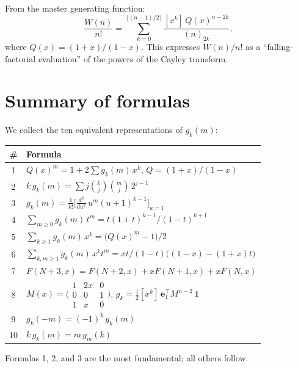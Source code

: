 \documentclass[11pt]{amsart}
\theoremstyle{definition}
\begin{document}
From the master generating function:
\[
\frac{W(n)}{n!} = \sum_{k=0}^{\lfloor(n-1)/2\rfloor} \frac{[x^k]\, Q(x)^{n-2k}}{(n)_{2k}},
\]
where $Q(x) = (1+x)/(1-x)$. This expresses $W(n)/n!$ as a ``falling-factorial evaluation'' of the powers of the Cayley transform.

\section{Summary of formulas}

We collect the ten equivalent representations of $g_k(m)$:

\begin{center}
\renewcommand{\arraystretch}{1.4}
\begin{tabular}{@{}cl@{}}
\toprule
\# & Formula \\
\midrule
1 & $Q(x)^m = 1 + 2\sum g_k(m)\, x^k$, \quad $Q = (1+x)/(1-x)$ \\
2 & $k\, g_k(m) = \sum j\binom{k}{j}\binom{m}{j}\, 2^{j-1}$ \\
3 & $g_k(m) = \frac{1}{k!}\bigl[\frac{d^k}{du^k}\, u^m(u+1)^{k-1}\bigr]_{u=1}$ \\
4 & $\sum_{m \geq 0} g_k(m)\, t^m = t(1+t)^{k-1}/(1-t)^{k+1}$ \\
5 & $\sum_{k \geq 1} g_k(m)\, x^k = \bigl(Q(x)^m - 1\bigr)/2$ \\
6 & $\sum_{k,m \geq 1} g_k(m)\, x^k t^m = xt\bigl/(1-t)\bigl((1{-}x)-(1{+}x)t\bigr)$ \\
7 & $F(N{+}3,x) = F(N{+}2,x) + xF(N{+}1,x) + xF(N,x)$ \\
8 & $M(x) = \bigl(\begin{smallmatrix} 1 & 2x & 0 \\ 0 & 0 & 1 \\ 1 & x & 0 \end{smallmatrix}\bigr)$, \quad $g_k = \tfrac{1}{2}[x^k]\, \mathbf{e}_1^\top M^{n-2}\, \mathbf{1}$ \\
9 & $g_k(-m) = (-1)^k\, g_k(m)$ \\
10 & $k\, g_k(m) = m\, g_m(k)$ \\
\bottomrule
\end{tabular}
\end{center}

\medskip

Formulas 1, 2, and 3 are the most fundamental; all others follow.
\end{document}
